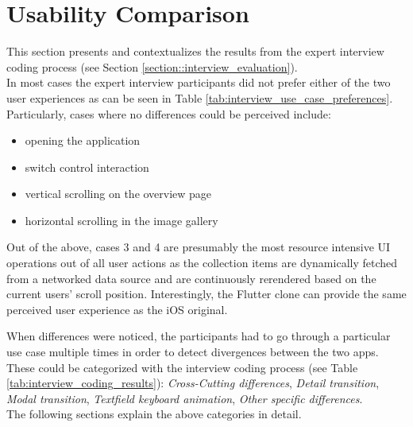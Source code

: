 \section{Usability Comparison} \label{section::usability_comparison}
This section presents and contextualizes the results from the expert interview coding process (see Section \ref{section::interview_evaluation}).\\
In most cases the expert interview participants did not prefer either of the two user experiences as can be seen in Table \ref{tab:interview_use_case_preferences}.
Particularly, cases where no differences could be perceived include:
\begin{itemize}
    \item opening the application
    \item switch control interaction
    \item vertical scrolling on the overview page
    \item horizontal scrolling in the image gallery
\end{itemize}
Out of the above, cases 3 and 4 are presumably the most resource intensive UI operations out of all user actions as the collection items are dynamically fetched from a networked data source and are continuously rerendered based on the current users' scroll position.
Interestingly, the Flutter clone can provide the same perceived user experience as the iOS original.

When differences were noticed, the participants had to go through a particular use case multiple times in order to detect divergences between the two apps.
These could be categorized with the interview coding process (see Table \ref{tab:interview_coding_results}): \textit{Cross-Cutting differences}, \textit{Detail transition}, \textit{Modal transition}, \textit{Textfield keyboard animation}, \textit{Other specific differences}.\\
The following sections explain the above categories in detail.

\begin{table}[!htp]\centering
    \caption{Interview Use Case Cumulated Preference Choices}\label{tab:interview_use_case_preferences}
\end{table}

